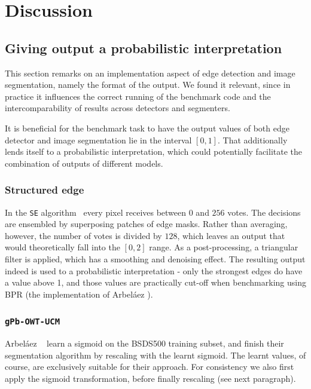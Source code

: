 \section{Discussion}
\subsection{Giving output a probabilistic interpretation}
This section remarks on an implementation aspect of edge detection and image segmentation, namely the format of the output. We found it relevant, since in practice it influences the correct running of the benchmark code and the intercomparability %
of results across detectors and segmenters.

It is beneficial %
for the benchmark task to have the output values of both edge detector and image segmentation lie in the interval %
$[0,1]$. That additionally lends itself to a probabilistic interpretation, which could potentially facilitate the combination of outputs of different models. %

\subsubsection{Structured edge}
In the {\tt SE} algorithm~\cite{DollarICCV13edges,Dollar2015PAMI} every pixel receives between $0$ and $256$ votes. The decisions are ensembled by superposing patches of edge masks. Rather than averaging, however, the number of votes is divided by $128$, which leaves an output that would theoretically fall into the $[0, 2]$ range. As a post-processing, a triangular filter is applied, which has a smoothing and denoising effect. The resulting output indeed is used to %
a probabilistic interpretation - only the strongest edges do have a value above 1, and those values are practically cut-off when benchmarking using BPR (the implementation of Arbel\'aez \etal).

\subsubsection{{\tt gPb-OWT-UCM}}
Arbel\'aez \etal~\cite{Arbelaez11} learn a sigmoid on the BSDS500 training subset, and finish their segmentation algorithm by rescaling with the learnt sigmoid. The learnt values, of course, are exclusively suitable for their approach. For consistency we also first apply the sigmoid transformation, before finally rescaling (see next paragraph).

